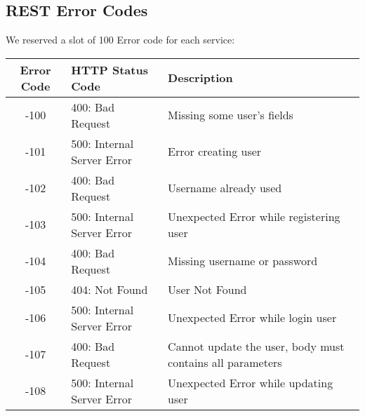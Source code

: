 \subsection{REST Error Codes}

We reserved a slot of 100 Error code for each service:


\renewcommand{\arraystretch}{1}
\begin{longtable}{ | c | l | p{} | }
\hline
\textbf{Error Code} & \textbf{HTTP Status Code} & \textbf{Description} \\\hline
-100 & 400: Bad Request & Missing some user's fields
\\
-101 & 500: Internal Server Error & Error creating user
\\
-102 & 400: Bad Request & Username already used
\\
-103 & 500: Internal Server Error & Unexpected Error while registering user
\\
-104 & 400: Bad Request & Missing username or password
\\
-105 & 404: Not Found & User Not Found
\\
-106 & 500: Internal Server Error & Unexpected Error while login user 
\\
-107 & 400: Bad Request & Cannot update the user, body must contains all parameters
\\
-108 & 500: Internal Server Error & Unexpected Error while updating user \\\hline


\end{longtable}
